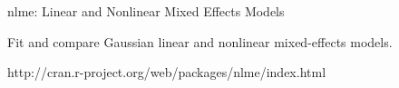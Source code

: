 nlme: Linear and Nonlinear Mixed Effects Models

Fit and compare Gaussian linear and nonlinear mixed-effects models.

http://cran.r-project.org/web/packages/nlme/index.html
